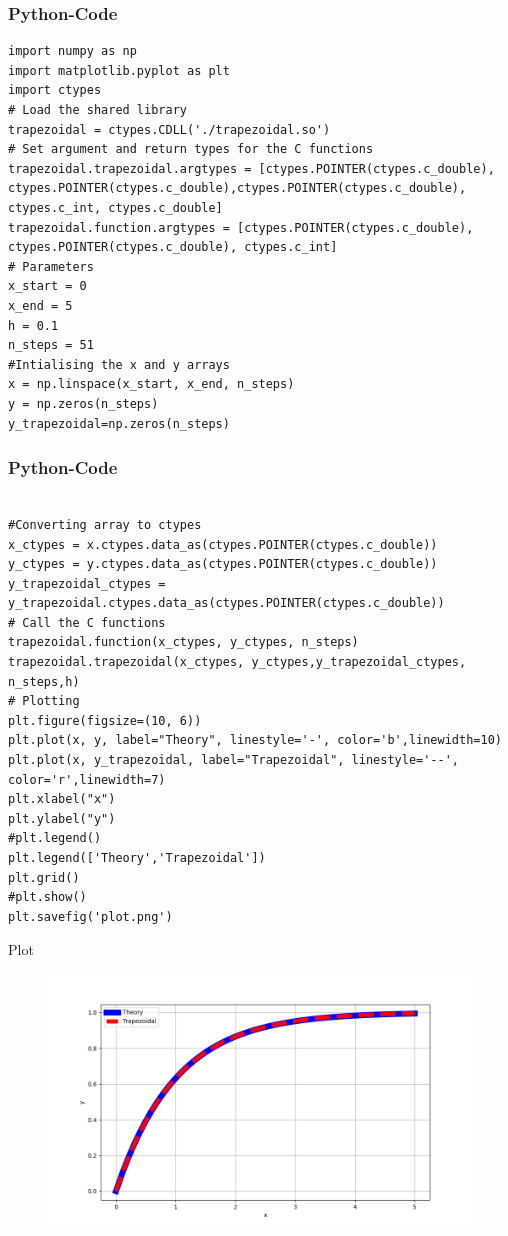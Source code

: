 \documentclass{beamer}
\begin{document}
\begin{frame}[fragile]
\frametitle{Python-Code}
\begin{verbatim}
import numpy as np
import matplotlib.pyplot as plt
import ctypes
# Load the shared library
trapezoidal = ctypes.CDLL('./trapezoidal.so')
# Set argument and return types for the C functions
trapezoidal.trapezoidal.argtypes = [ctypes.POINTER(ctypes.c_double), ctypes.POINTER(ctypes.c_double),ctypes.POINTER(ctypes.c_double), ctypes.c_int, ctypes.c_double]
trapezoidal.function.argtypes = [ctypes.POINTER(ctypes.c_double), ctypes.POINTER(ctypes.c_double), ctypes.c_int]
# Parameters
x_start = 0
x_end = 5
h = 0.1
n_steps = 51
#Intialising the x and y arrays
x = np.linspace(x_start, x_end, n_steps)
y = np.zeros(n_steps)
y_trapezoidal=np.zeros(n_steps)
\end{verbatim}
\end{frame}
\begin{frame}[fragile]
\frametitle{Python-Code}
\begin{verbatim}

#Converting array to ctypes
x_ctypes = x.ctypes.data_as(ctypes.POINTER(ctypes.c_double))
y_ctypes = y.ctypes.data_as(ctypes.POINTER(ctypes.c_double))
y_trapezoidal_ctypes = y_trapezoidal.ctypes.data_as(ctypes.POINTER(ctypes.c_double))
# Call the C functions
trapezoidal.function(x_ctypes, y_ctypes, n_steps)
trapezoidal.trapezoidal(x_ctypes, y_ctypes,y_trapezoidal_ctypes, n_steps,h)
# Plotting
plt.figure(figsize=(10, 6))
plt.plot(x, y, label="Theory", linestyle='-', color='b',linewidth=10)
plt.plot(x, y_trapezoidal, label="Trapezoidal", linestyle='--', color='r',linewidth=7)
plt.xlabel("x")
plt.ylabel("y")
#plt.legend()
plt.legend(['Theory','Trapezoidal'])
plt.grid()
#plt.show()
plt.savefig('plot.png')
\end{verbatim}
\end{frame}
\begin{frame}{Plot}
    \begin{figure}[h!]
    \centering
    \includegraphics[width=0.7\columnwidth]{figs/Q2.png}
    \label{stemplot}
\end{figure}
\end{frame}
\end{document}
